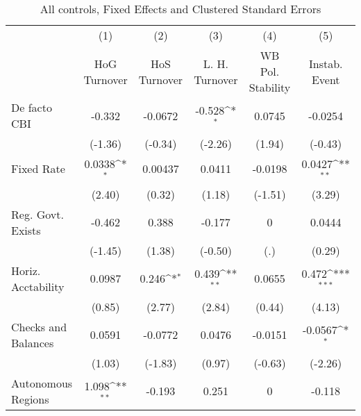 \begin{table}[htbp]\centering
\def\sym#1{\ifmmode^{#1}\else\(^{#1}\)\fi}
\caption{All controls, Fixed Effects and Clustered Standard Errors \label{fullcmultIndFEDF}}
\begin{tabular}{l*{5}{c}}
\toprule
                                        &\multicolumn{1}{c}{(1)}&\multicolumn{1}{c}{(2)}&\multicolumn{1}{c}{(3)}&\multicolumn{1}{c}{(4)}&\multicolumn{1}{c}{(5)}\\
                                        &\multicolumn{1}{c}{HoG Turnover}&\multicolumn{1}{c}{HoS Turnover}&\multicolumn{1}{c}{L. H. Turnover}&\multicolumn{1}{c}{WB Pol. Stability}&\multicolumn{1}{c}{Instab. Event}\\
\midrule
De facto CBI                            &   -0.332         &  -0.0672         &   -0.528\sym{*}  &   0.0745         &  -0.0254         \\
                                        &  (-1.36)         &  (-0.34)         &  (-2.26)         &   (1.94)         &  (-0.43)         \\
\addlinespace
Fixed Rate                              &   0.0338\sym{*}  &  0.00437         &   0.0411         &  -0.0198         &   0.0427\sym{**} \\
                                        &   (2.40)         &   (0.32)         &   (1.18)         &  (-1.51)         &   (3.29)         \\
\addlinespace
Reg. Govt. Exists                       &   -0.462         &    0.388         &   -0.177         &        0         &   0.0444         \\
                                        &  (-1.45)         &   (1.38)         &  (-0.50)         &      (.)         &   (0.29)         \\
\addlinespace
Horiz. Acctability                      &   0.0987         &    0.246\sym{*}  &    0.439\sym{**} &   0.0655         &    0.472\sym{***}\\
                                        &   (0.85)         &   (2.77)         &   (2.84)         &   (0.44)         &   (4.13)         \\
\addlinespace
Checks and Balances                     &   0.0591         &  -0.0772         &   0.0476         &  -0.0151         &  -0.0567\sym{*}  \\
                                        &   (1.03)         &  (-1.83)         &   (0.97)         &  (-0.63)         &  (-2.26)         \\
\addlinespace
Autonomous Regions                      &    1.098\sym{**} &   -0.193         &    0.251         &        0         &   -0.118         \\

\end{tabular}
\end{table}
